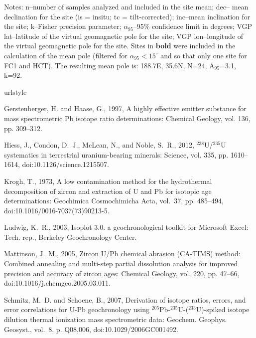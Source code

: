 \documentclass[11pt,letterpaper]{article}
\begin{document}
\begin{table}[h!]
Notes: n--number of samples analyzed and included in the site mean; dec-- mean declination for the site (is = insitu; tc = tilt-corrected); inc--mean inclination for the site; k--Fisher precision parameter; $\alpha_{95}$--95$\%$ confidence limit in degrees; VGP lat--latitude of the virtual geomagnetic pole for the site; VGP lon--longitude of the virtual geomagnetic pole for the site. Sites in \textbf{bold} were included in the calculation of the mean pole (filtered for $\alpha_{95}<15^{\circ}$ and so that only one site for FC1 and HCT). The resulting mean pole is: 188.7\textdegree E, 35.6\textdegree N, N=24, A$_{95}$=3.1, k=92.
\end{table}

\clearpage
\pagebreak
\singlespacing

\small
\begin{thebibliography}{6}
\providecommand{\natexlab}[1]{#1}
\providecommand{\url}[1]{\texttt{#1}}
\providecommand{\urlprefix}{URL }
\expandafter\ifx\csname urlstyle\endcsname\relax
  \providecommand{\doi}[1]{doi:\discretionary{}{}{}#1}\else
  \providecommand{\doi}{doi:\discretionary{}{}{}\begingroup
  \urlstyle{rm}\Url}\fi

Gerstenberger, H. and Haase, G., 1997, A highly effective emitter substance for
  mass spectrometric {P}b isotope ratio determinations: Chemical Geology, vol.
  136, pp. 309--312.

Hiess, J., Condon, D.~J., McLean, N., and Noble, S.~R., 2012,
  $^{238}${U}/$^{235}${U} systematics in terrestrial uranium-bearing minerals:
  Science, vol. 335, pp. 1610--1614, \doi{10.1126/science.1215507}.

Krogh, T., 1973, A low contamination method for the hydrothermal decomposition
  of zircon and extraction of {U} and {P}b for isotopic age determinations:
  Geochimica Cosmochimicha Acta, vol.~37, pp. 485--494,
  \doi{10.1016/0016-7037(73)90213-5}.

Ludwig, K.~R., 2003, Isoplot 3.0. a geochronological toolkit for {M}icrosoft
  {E}xcel: Tech. rep., Berkeley Geochronology Center.

Mattinson, J.~M., 2005, {Zircon U/Pb chemical abrasion (CA-TIMS) method:
  Combined annealing and multi-step partial dissolution analysis for improved
  precision and accuracy of zircon ages}: Chemical Geology, vol. 220, pp.
  47--66, \doi{10.1016/j.chemgeo.2005.03.011}.

Schmitz, M.~D. and Schoene, B., 2007, {Derivation of isotope ratios, errors,
  and error correlations for U-Pb geochronology using
  $^{205}$Pb-$^{235}$U-($^{233}$U)-spiked isotope dilution thermal ionization
  mass spectrometric data}: Geochem. Geophys. Geosyst., vol.~8, p. Q08,006,
  \doi{10.1029/2006GC001492}.

\end{thebibliography}

%
%
\end{document}
